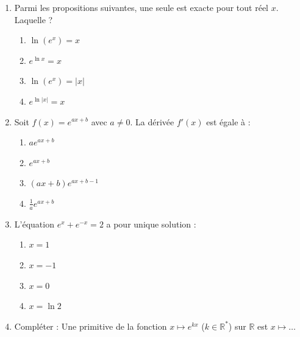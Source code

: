 \documentclass[11pt]{article}
\begin{document}
\begin{exercice}
\begin{enumerate}
    \item Parmi les propositions suivantes, une seule est exacte pour tout réel $x$. Laquelle ?
    \begin{enumerate}
        \item $\ln(e^{x}) = x$
        \item $e^{\ln x} = x$
        \item $\ln(e^{x}) = |x|$
        \item $e^{\ln |x|} = x$
    \end{enumerate}
    \item Soit $f(x) = e^{ax+b}$ avec $a \neq 0$. La dérivée $f'(x)$ est égale à :
    \begin{enumerate}
        \item $a e^{ax+b}$
        \item $e^{ax+b}$
        \item $(ax+b)e^{ax+b-1}$
        \item $\frac{1}{a}e^{ax+b}$
    \end{enumerate}
    \item L'équation $e^{x} + e^{-x} = 2$ a pour unique solution :
    \begin{enumerate}
        \item $x = 1$
        \item $x = -1$
        \item $x = 0$
        \item $x = \ln 2$
    \end{enumerate}
    \item Compléter : Une primitive de la fonction $x \mapsto e^{kx}$ ($k \in \mathbb{R}^*$) sur $\mathbb{R}$ est $x \mapsto \dots$
\end{enumerate}
\end{exercice}
\end{document}
